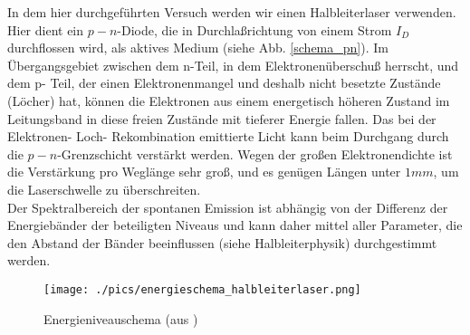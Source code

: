 \documentclass[a4paper,oneside]{article}
\begin{document}
In dem hier durchgeführten Versuch werden wir einen Halbleiterlaser verwenden. Hier dient ein $p-n$-Diode, die in Durchlaßrichtung von einem Strom $I_D$ durchflossen wird, als aktives Medium (siehe Abb. \ref{schema_pn}). Im Übergangsgebiet zwischen dem n-Teil, in dem Elektronenüberschuß herrscht, und dem p- Teil, der einen Elektronenmangel und deshalb nicht besetzte Zustände (Löcher) hat, können die Elektronen aus einem energetisch höheren Zustand im Leitungsband in diese freien Zustände mit tieferer Energie fallen. Das bei der Elektronen- Loch- Rekombination emittierte Licht kann beim Durchgang durch die $p-n$-Grenzschicht verstärkt werden. Wegen der großen Elektronendichte ist die Verstärkung pro Weglänge sehr groß, und es genügen Längen unter $1 mm$, um die Laserschwelle zu überschreiten.\\
Der Spektralbereich der spontanen Emission ist abhängig von der Differenz der Energiebänder der beteiligten Niveaus und kann daher mittel aller Parameter, die den Abstand der Bänder beeinflussen (siehe Halbleiterphysik) durchgestimmt werden.
\begin{figure}
 \centering
 \texttt{[image: ./pics/energieschema\_halbleiterlaser.png]}
 \caption{Energieniveauschema (aus \cite{dem3})}
\end{figure}
\end{document}
